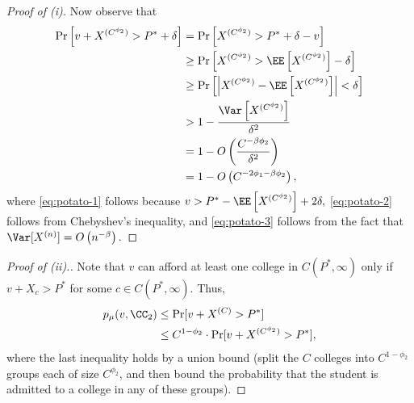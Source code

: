 \documentclass[10pt]{article}
\begin{document}
\begin{ReviewVerbatim}
\begin{proof}[Proof of (i)]
    Now observe that
    \begin{align}
        \Pr\left[v + X^{(C^{\phi_2})} > P^* + \delta\right] &= \Pr\left[X^{(C^{\phi_2})} > P^* + \delta - v\right]\\
        &\ge \Pr\left[X^{(C^{\phi_2})} > \EE\left[X^{(C^{\phi_2})}\right] - \delta \right] \label{eq:potato-1} \\
        &\ge \Pr\left[\left|X^{(C^{\phi_2})} - \EE\left[X^{(C^{\phi_2})}\right]\right| < \delta \right] \\
        &> 1 - \frac{\Var\left[X^{(C^{\phi_2})}\right]}{\delta^2} \label{eq:potato-2} \\
        &= 1 - O\left(\frac{C^{-\beta\phi_2}}{\delta^2}\right) \label{eq:potato-3} \\
        &= 1 - O\left(C^{-2\phi_1 - \beta\phi_2}\right),
    \end{align}
    where \eqref{eq:potato-1} follows because $v > P^* - \EE\left[X^{(C^{\phi_2})}\right]  + 2\delta,$ \eqref{eq:potato-2} follows from Chebyshev's inequality, and \eqref{eq:potato-3} follows from the fact that $\Var[X^{(n)}] = O\left(n^{-\beta}\right).$
\end{proof}

\begin{proof}[Proof of (ii).]
Note that $v$ can afford at least one college in $C(P^*, \infty)$ only if $v + X_c > P^*$ for some $c\in C(P^*, \infty).$ Thus,
    \begin{align}
        p_\mu(v, \CC_2) &\le \Pr[v + X^{(C)} > P^*]\\
        &\le C^{1 - \phi_2} \cdot \Pr[v + X^{(C^{\phi_2})} > P^*],
    \end{align}
    where the last inequality holds by a union bound (split the $C$ colleges into $C^{1-\phi_2}$ groups each of size $C^{\phi_2}$, and then bound the probability that the student is admitted to a college in any of these groups).


\end{proof}
\end{ReviewVerbatim}
\end{document}
